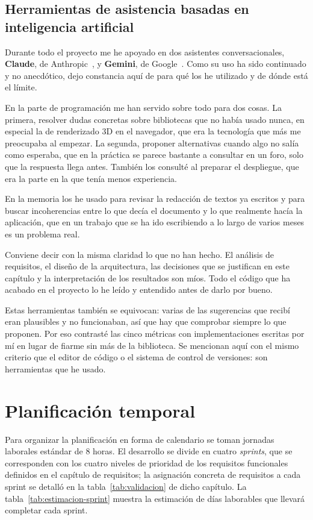 \subsection{Herramientas de asistencia basadas en inteligencia artificial}

Durante todo el proyecto me he apoyado en dos asistentes conversacionales, \textbf{Claude}, de
Anthropic~\cite{claude}, y \textbf{Gemini}, de Google~\cite{gemini}. Como su uso ha sido continuado y
no anecdótico, dejo constancia aquí de para qué los he utilizado y de dónde está el límite.

En la parte de programación me han servido sobre todo para dos cosas. La primera, resolver dudas
concretas sobre bibliotecas que no había usado nunca, en especial la de renderizado 3D en el
navegador, que era la tecnología que más me preocupaba al empezar. La segunda, proponer alternativas
cuando algo no salía como esperaba, que en la práctica se parece bastante a consultar en un foro,
solo que la respuesta llega antes. También los consulté al preparar el despliegue, que era la parte
en la que tenía menos experiencia.

En la memoria los he usado para revisar la redacción de textos ya escritos y para buscar
incoherencias entre lo que decía el documento y lo que realmente hacía la aplicación, que en un
trabajo que se ha ido escribiendo a lo largo de varios meses es un problema real.

Conviene decir con la misma claridad lo que no han hecho. El análisis de requisitos, el diseño de la
arquitectura, las decisiones que se justifican en este capítulo y la interpretación de los
resultados son míos. Todo el código que ha acabado en el proyecto lo he leído y entendido antes de
darlo por bueno.

Estas herramientas también se equivocan: varias de las sugerencias que recibí eran plausibles y no
funcionaban, así que hay que comprobar siempre lo que proponen. Por eso contrasté las cinco métricas
con implementaciones escritas por mí en lugar de fiarme sin más de la biblioteca. Se mencionan aquí
con el mismo criterio que el editor de código o el sistema de control de versiones: son herramientas
que he usado.

\section{Planificación temporal}

Para organizar la planificación en forma de calendario se toman jornadas laborales estándar de 8
horas. El desarrollo se divide en cuatro \textit{sprints}, que se corresponden con los cuatro niveles
de prioridad de los requisitos funcionales definidos en el capítulo de requisitos; la asignación
concreta de requisitos a cada sprint se detalló en la tabla~\ref{tab:validacion} de dicho capítulo.
La tabla~\ref{tab:estimacion-sprint} muestra la estimación de días laborables que llevará completar
cada sprint.

